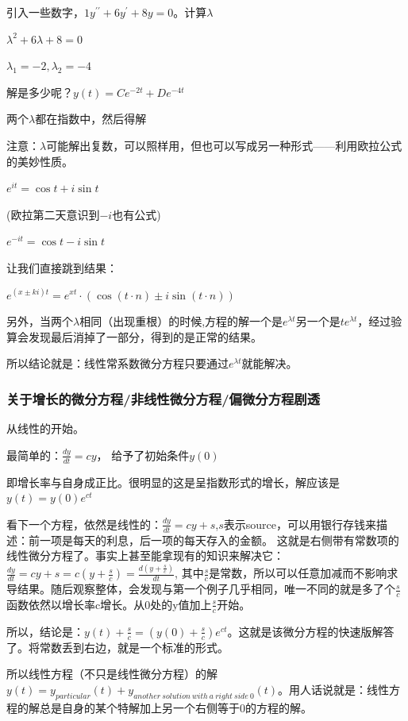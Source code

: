 \documentclass[UTF8]{ctexbook}
\newcommand{\derivative}{^\prime}
\newcommand{\doubleDerivative}{^{\prime\prime}}
\begin{document}
{{{{引入一些数字，$1y\doubleDerivative + 6y\derivative + 8y = 0$。计算$\lambda$

$\lambda^2 + 6\lambda + 8 = 0$

$\lambda_1 = -2, \lambda_2 = -4$

解是多少呢？$y(t) = Ce^{-2t} + De^{-4t}$

两个$\lambda$都在指数中，然后得解

注意：$\lambda$可能解出复数，可以照样用，但也可以写成另一种形式——利用欧拉公式的美妙性质。

$e^{it} = \cos t + i\sin t$

(欧拉第二天意识到$-i$也有公式)

$e^{-it} = \cos t -i\sin t$

让我们直接跳到结果：

$e^{(x \pm ki)t} = e^{xt}\cdot(\cos(t\cdot n) \pm i\sin(t\cdot n))$

另外，当两个$\lambda$相同（出现重根）的时候,方程的解一个是$e^{\lambda t}$另一个是$te^{\lambda t}$，经过验算会发现最后消掉了一部分，得到的是正常的结果。

所以结论就是：线性常系数微分方程只要通过$e^{\lambda t}$就能解决。
}%

\subsubsection{关于增长的微分方程/非线性微分方程/偏微分方程剧透}{
  从线性的开始。

  最简单的：$\frac{dy}{dt} = cy$， 给予了初始条件$y(0)$

  即增长率与自身成正比。很明显的这是呈指数形式的增长，解应该是$y(t) = y(0)e^{ct}$

  看下一个方程，依然是线性的：$\frac{dy}{dt} = cy + s$,$s$表示source，可以用银行存钱来描述：前一项是每天的利息，后一项的每天存入的金额。
  这就是右侧带有常数项的线性微分方程了。事实上甚至能拿现有的知识来解决它：$\frac{dy}{dt} = cy + s = c(y + \frac{s}{c}) = \frac{d(y + \frac{s}{c})}{dt}$, 其中$\frac{s}{c}$是常数，所以可以任意加减而不影响求导结果。随后观察整体，会发现与第一个例子几乎相同，唯一不同的就是多了个$\frac{s}{c}$函数依然以增长率c增长。从0处的y值加上$\frac{s}{c}$开始。

  所以，结论是：$y(t) + \frac{s}{c} = (y(0) + \frac{s}{c})e^{ct}$。这就是该微分方程的快速版解答了。将常数丢到右边，就是一个标准的形式。

  所以线性方程（不只是线性微分方程）的解$y(t) = y_{particular}(t) + y_{another\ solution\ with\ a\ right\ side\ 0}(t)$。用人话说就是：线性方程的解总是自身的某个特解加上另一个右侧等于0的方程的解。

}}}}
\end{document}

